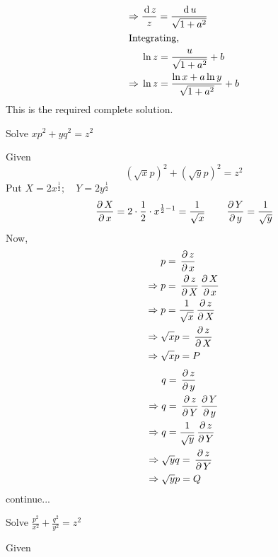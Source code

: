 \documentclass[../main-sheet.tex]{subfiles}
\begin{document}
\begin{enumerate}[label=\underline{Type - \Roman*}:]
\begin{soln}
\begin{align*}
                \Rightarrow\;&\frac{\,\mathrm{d}\, z}{z}=\frac{\,\mathrm{d}\, u}{\sqrt{1+a^2}}\\
                \intertext{Integrating,}
                &\ln z=\frac{u}{\sqrt{1+a^2}}+b\\
                \Rightarrow\;&\ln z=\frac{\ln x+a\ln y}{\sqrt{1+a^2}}+b
            \end{align*}
            This is the required complete solution.
        \end{soln}
        \begin{prob}
            Solve \(xp^2+yq^2=z^2\)
        \end{prob}
        \begin{soln}
            Given
            \begin{equation}
                (\sqrt{x}p)^2+(\sqrt{y}p)^2=z^2\label{eq:t2.4.1}
            \end{equation}
            Put \(X=2x^{\frac{1}{2}};\quad Y=2y^{\frac{1}{2}}\)\\
            \[\,\frac{\partial\, X}{\partial\, x}=2\cdot\frac{1}{2}\cdot x^{\frac{1}{2}-1}=\frac{1}{\sqrt{x}}\qquad\,\frac{\partial\, Y}{\partial\, y}=\frac{1}{\sqrt{y}}\]
            Now,
            \begin{align*}
                &p=\,\frac{\partial\, z}{\partial\, x}\\
                \Rightarrow\;&p=\,\frac{\partial\, z}{\partial\, X}\,\frac{\partial\, X}{\partial\, x}\\
                \Rightarrow\;&p=\frac{1}{\sqrt{x}}\,\frac{\partial\, z}{\partial\, X}\\
                \Rightarrow\;&\sqrt{x}p=\,\frac{\partial\, z}{\partial\, X}\\
                \Rightarrow\;&\sqrt{x}p=P
            \end{align*}
            \begin{align*}
                &q=\,\frac{\partial\, z}{\partial\, y}\\
                \Rightarrow\;&q=\,\frac{\partial\, z}{\partial\, Y}\,\frac{\partial\, Y}{\partial\, y}\\
                \Rightarrow\;&q=\frac{1}{\sqrt{y}}\,\frac{\partial\, z}{\partial\, Y}\\
                \Rightarrow\;&\sqrt{y}q=\,\frac{\partial\, z}{\partial\, Y}\\
                \Rightarrow\;&\sqrt{y}p=Q
            \end{align*}
            continue...
        \end{soln}
        \begin{prob}
            Solve \(\displaystyle \frac{p^2}{x^2}+\frac{q^2}{y^2}=z^2\)
        \end{prob}
        \begin{soln}
            Given
            \begin{equation}

\end{equation}
\end{soln}
\end{enumerate}
\end{document}

